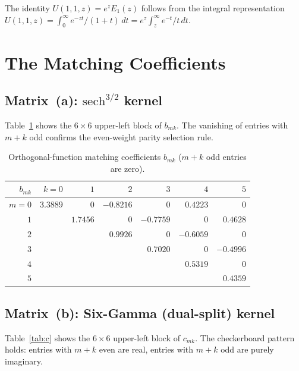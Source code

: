 \documentclass[11pt,a4paper]{article}
\begin{document}
The identity $U(1,1,z) = e^z E_1(z)$ follows from the
integral representation
$U(1,1,z) = \int_0^\infty e^{-zt}/(1+t)\,dt = e^z\int_z^\infty e^{-t}/t\,dt$.

\section{The Matching Coefficients}

\subsection{Matrix~(a): $\mathrm{sech}^{3/2}$ kernel}

Table~\ref{tab:b} shows the $6 \times 6$ upper-left block of $b_{mk}$.
The vanishing of entries with $m+k$ odd confirms the even-weight
parity selection rule.

\begin{table}[ht]
\centering
\small
\caption{Orthogonal-function matching coefficients $b_{mk}$
($m+k$ odd entries are zero).}\label{tab:b}
\begin{tabular}{r|rrrrrr}
$b_{mk}$ & $k=0$ & $1$ & $2$ & $3$ & $4$ & $5$ \\
\hline
$m=0$ & $3.3889$ & $0$ & $-0.8216$ & $0$ & $0.4223$ & $0$ \\
$1$ & & $1.7456$ & $0$ & $-0.7759$ & $0$ & $0.4628$ \\
$2$ & & & $0.9926$ & $0$ & $-0.6059$ & $0$ \\
$3$ & & & & $0.7020$ & $0$ & $-0.4996$ \\
$4$ & & & & & $0.5319$ & $0$ \\
$5$ & & & & & & $0.4359$
\end{tabular}
\end{table}

\subsection{Matrix~(b): Six-Gamma (dual-split) kernel}

Table~\ref{tab:c} shows the $6 \times 6$ upper-left block of $c_{mk}$.
The checkerboard pattern holds: entries with $m+k$ even are real,
entries with $m+k$ odd are purely imaginary.
\end{document}
